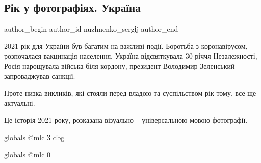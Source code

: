  
 
 
 
 
\subsection{Рік у фотографіях. Україна}
\label{sec:17_01_2022.stz.news.ua.radiosvoboda.1.ukraina_rik_foto}

\ifcmt
 author_begin
   author_id nuzhnenko_sergіj
 author_end
\fi

\begin{zznagolos}
2021 рік для України був багатим на важливі події. Боротьба з коронавірусом,
розпочалася вакцинація населення, Україна відсвяткувала 30-річчя Незалежності,
Росія нарощувала війська біля кордону, президент Володимир Зеленський
запроваджував санкції.

Проте низка викликів, які стояли перед владою та суспільством рік тому, все ще
актуальні.

Це історія 2021 року, розказана візуально – універсальною мовою фотографії.
\end{zznagolos}

\ifcmt
  globals
  @mlc 3
  dbg
\fi






\ifcmt
  globals
  @mlc 0
\fi
